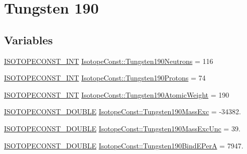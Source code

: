\hypertarget{group___isotope_const-_tungsten-_w190}{}\section{Tungsten 190}
\label{group___isotope_const-_tungsten-_w190}
\subsection*{Variables}
\begin{DoxyCompactItemize}
\item 
\mbox{\hyperlink{group___isotope_const-_macros_ga5f18360b3e99483a35c32d789e62621c}{I\+S\+O\+T\+O\+P\+E\+C\+O\+N\+S\+T\+\_\+\+I\+NT}} \mbox{\hyperlink{group___isotope_const-_tungsten-_w190_gaadd98049b39933ce99c3fdc2dcc5752d}{Isotope\+Const\+::\+Tungsten190\+Neutrons}} = 116
\item 
\mbox{\hyperlink{group___isotope_const-_macros_ga5f18360b3e99483a35c32d789e62621c}{I\+S\+O\+T\+O\+P\+E\+C\+O\+N\+S\+T\+\_\+\+I\+NT}} \mbox{\hyperlink{group___isotope_const-_tungsten-_w190_ga90676d06cb34230a999301a1d6365bba}{Isotope\+Const\+::\+Tungsten190\+Protons}} = 74
\item 
\mbox{\hyperlink{group___isotope_const-_macros_ga5f18360b3e99483a35c32d789e62621c}{I\+S\+O\+T\+O\+P\+E\+C\+O\+N\+S\+T\+\_\+\+I\+NT}} \mbox{\hyperlink{group___isotope_const-_tungsten-_w190_gac8c26c43bd65bc6825999abf15099486}{Isotope\+Const\+::\+Tungsten190\+Atomic\+Weight}} = 190
\item 
\mbox{\hyperlink{group___isotope_const-_macros_ga8f45a7272ce02c0b4c65c44636ed719a}{I\+S\+O\+T\+O\+P\+E\+C\+O\+N\+S\+T\+\_\+\+D\+O\+U\+B\+LE}} \mbox{\hyperlink{group___isotope_const-_tungsten-_w190_ga812ff7c3a8961940957f93e02cc65ab1}{Isotope\+Const\+::\+Tungsten190\+Mass\+Exc}} = -\/34382.
\item 
\mbox{\hyperlink{group___isotope_const-_macros_ga8f45a7272ce02c0b4c65c44636ed719a}{I\+S\+O\+T\+O\+P\+E\+C\+O\+N\+S\+T\+\_\+\+D\+O\+U\+B\+LE}} \mbox{\hyperlink{group___isotope_const-_tungsten-_w190_ga7485f52c9c6fb61bc90b0b260631d979}{Isotope\+Const\+::\+Tungsten190\+Mass\+Exc\+Unc}} = 39.
\item 
\mbox{\hyperlink{group___isotope_const-_macros_ga8f45a7272ce02c0b4c65c44636ed719a}{I\+S\+O\+T\+O\+P\+E\+C\+O\+N\+S\+T\+\_\+\+D\+O\+U\+B\+LE}} \mbox{\hyperlink{group___isotope_const-_tungsten-_w190_gaa6600de572c1830711eaaae03b76f512}{Isotope\+Const\+::\+Tungsten190\+Bind\+E\+PerA}} = 7947.
\item 

\end{DoxyCompactItemize}
